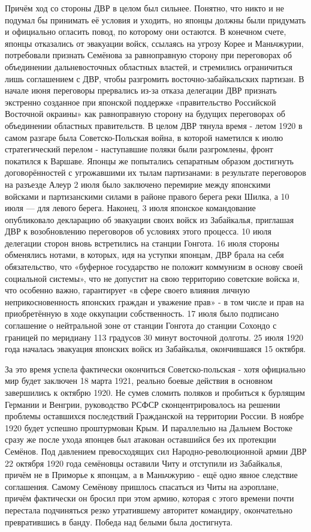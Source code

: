 Причём ход со стороны ДВР в целом был сильнее. Понятно, что никто и не подумал бы принимать её условия и уходить, но японцы должны были придумать и официально огласить повод, по которому они остаются. В конечном счете, японцы отказались от эвакуации войск, ссылаясь на угрозу Корее и Маньчжурии, потребовали признать Семёнова за равноправную сторону при переговорах об объединении дальневосточных областных властей, и стремились ограничиться лишь соглашением с ДВР, чтобы разгромить восточно-забайкальских партизан. В начале июня переговоры прервались из-за отказа делегации ДВР признать экстренно созданное при японской поддержке «правительство Российской Восточной окраины» как равноправную сторону на будущих переговорах об объединении областных правительств. В целом ДВР тянула время - летом 1920 в самом разгаре была Советско-Польская война, в которой наметился к июлю стратегический перелом - наступавшие поляки были разгромлены, фронт покатился к Варшаве. Японцы же попытались сепаратным образом достигнуть договорённостей с угрожавшими их тылам партизанами: в результате переговоров на разъезде Алеур 2 июля было заключено перемирие между японскими войсками и партизанскими силами в районе правого берега реки Шилка, а 10 июля — для левого берега. Наконец, 3 июля японское командование опубликовало декларацию об эвакуации своих войск из Забайкалья, приглашая ДВР к возобновлению переговоров об условиях этого процесса. 10 июля делегации сторон вновь встретились на станции Гонгота. 16 июля стороны обменялись нотами, в которых, идя на уступки японцам, ДВР брала на себя обязательство, что «буферное государство не положит коммунизм в основу своей социальной системы», что не допустит на свою территорию советские войска и, что особенно важно, гарантирует «в сфере своего влияния личную неприкосновенность японских граждан и уважение прав» - в том числе и прав на приобретённую в ходе оккупации собственность. 17 июля было подписано соглашение о нейтральной зоне от станции Гонгота до станции Сохондо с границей по меридиану 113 градусов 30 минут восточной долготы. 25 июля 1920 года началась эвакуация японских войск из Забайкалья, окончившаяся 15 октября.

За это время успела фактически окончиться Советско-польская - хотя официально мир будет заключен 18 марта 1921, реально боевые действия в основном завершились к октябрю 1920. Не сумев сломить поляков и пробиться к бурлящим Германии и Венгрии, руководство РСФСР сконцентрировалось на решении проблемы оставшихся последствий Гражданской на территории России. В ноябре 1920 будет успешно проштурмован Крым. И параллельно на Дальнем Востоке сразу же после ухода японцев был атакован оставшийся без их протекции Семёнов. Под давлением превосходящих сил Народно-революционной армии ДВР 22 октября 1920 года семёновцы оставили Читу и отступили из Забайкалья, причём не в Приморье к японцам, а в Маньчжурию - ещё одно явное следствие соглашения. Самому Семёнову пришлось спасаться из Читы на аэроплане, причём фактически он бросил при этом армию, которая с этого времени почти перестала подчиняться резко утратившему авторитет командиру, окончательно превратившись в банду. Победа над белыми была достигнута.

